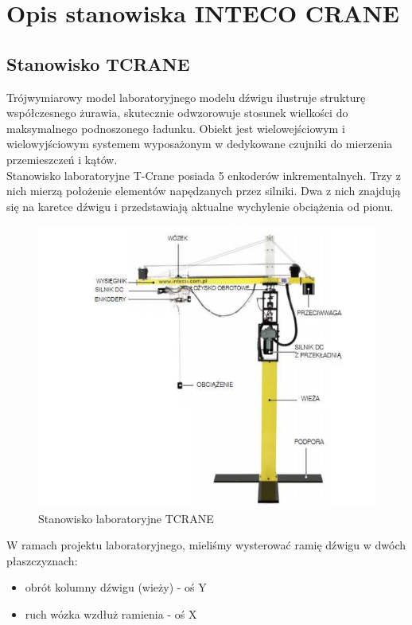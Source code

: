 \chapter{Opis stanowiska INTECO CRANE}
\label{inteco_stanowisko}

\section{Stanowisko TCRANE}
\label{inteco_stanowisko_TCRANE}
Trójwymiarowy model laboratoryjnego modelu dźwigu ilustruje strukturę współczesnego 
żurawia, skutecznie odwzorowuje stosunek wielkości do maksymalnego podnoszonego 
ładunku. Obiekt jest wielowejściowym i wielowyjściowym systemem wyposażonym w dedykowane
czujniki do mierzenia przemieszczeń i kątów.\\
\indent Stanowisko laboratoryjne T-Crane posiada 5 enkoderów inkrementalnych. Trzy z nich
mierzą położenie elementów napędzanych przez silniki. Dwa z nich znajdują się na karetce
dźwigu i przedstawiają aktualne wychylenie obciążenia od pionu.

\begin{figure}[H]
    \label{Opis::TCRANE::Stanowisko}
    \centering
    \includegraphics[scale=0.5]{./sections/inteco/images/tcrane.png}
    \caption{Stanowisko laboratoryjne TCRANE}
\end{figure}

W ramach projektu laboratoryjnego, mieliśmy wysterować ramię dźwigu w dwóch płaszczyznach:

\begin{itemize}
    \item obrót kolumny dźwigu (wieży) - oś Y
    \item ruch wózka wzdłuż ramienia - oś X
\end{itemize}



